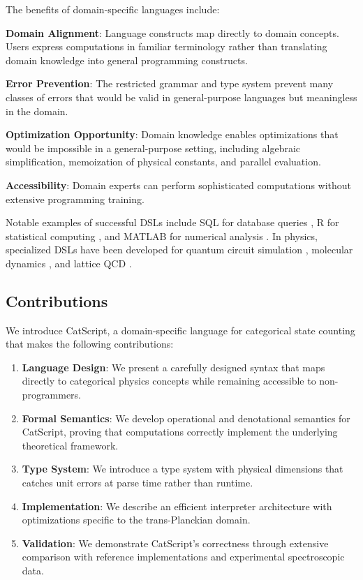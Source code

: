 \documentclass[twocolumn,10pt]{article}
\begin{document}
The benefits of domain-specific languages include:

\textbf{Domain Alignment}: Language constructs map directly to domain concepts. Users express computations in familiar terminology rather than translating domain knowledge into general programming constructs.

\textbf{Error Prevention}: The restricted grammar and type system prevent many classes of errors that would be valid in general-purpose languages but meaningless in the domain.

\textbf{Optimization Opportunity}: Domain knowledge enables optimizations that would be impossible in a general-purpose setting, including algebraic simplification, memoization of physical constants, and parallel evaluation.

\textbf{Accessibility}: Domain experts can perform sophisticated computations without extensive programming training.

Notable examples of successful DSLs include SQL for database queries \cite{chamberlin1974sql}, R for statistical computing \cite{r2020language}, and MATLAB for numerical analysis \cite{matlab2020}. In physics, specialized DSLs have been developed for quantum circuit simulation \cite{qiskit2019}, molecular dynamics \cite{gromacs2015}, and lattice QCD \cite{chroma2004}.

\subsection{Contributions}

We introduce CatScript, a domain-specific language for categorical state counting that makes the following contributions:

\begin{enumerate}
    \item \textbf{Language Design}: We present a carefully designed syntax that maps directly to categorical physics concepts while remaining accessible to non-programmers.

    \item \textbf{Formal Semantics}: We develop operational and denotational semantics for CatScript, proving that computations correctly implement the underlying theoretical framework.

    \item \textbf{Type System}: We introduce a type system with physical dimensions that catches unit errors at parse time rather than runtime.

    \item \textbf{Implementation}: We describe an efficient interpreter architecture with optimizations specific to the trans-Planckian domain.

    \item \textbf{Validation}: We demonstrate CatScript's correctness through extensive comparison with reference implementations and experimental spectroscopic data.
\end{enumerate}
\end{document}
